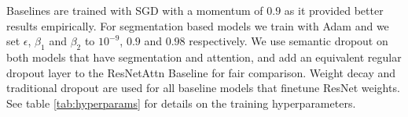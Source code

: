 Baselines are trained with SGD with a momentum of $0.9$ \cite{rumelhart_backprop}
as it provided better results empirically. For segmentation based models we train with
Adam \cite{kingma_adam} and we set $\epsilon$, $\beta_1$ and $\beta_2$ to $10^{-9}$, $0.9$ and $0.98$ respectively.
We use semantic dropout on both models that have segmentation and attention, and add
an equivalent regular dropout layer to the ResNetAttn Baseline for fair comparison.
Weight decay and traditional dropout are used for all baseline models that finetune ResNet weights.
See table \ref{tab:hyperparams} for details on the training hyperparameters.
